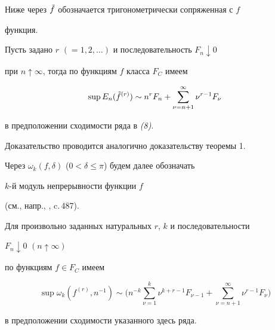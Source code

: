 Ниже через $\Tilde f$ обозначается тригонометрически сопряженная с $f$


функция.





\begin{thm}


Пусть задано $r$ $(=1,2,\dotsc)$ и последовательность $F_n\downarrow 0$


при $n\uparrow\infty$, тогда по функциям $f$ класса $F_C$ имеем


\begin{equation}


\sup E_n(\Tilde f^{(r)})\sim n^rF_n+\sum^\infty_{\nu=n+1}


\nu^{r-1}F_\nu


\end{equation}


в предположении сходимости ряда в {\em (8)}.


\end{thm}





Доказательство проводится аналогично доказательству теоремы 1.





Через $\omega_k(f,\delta)$ ($0<\delta\le\pi$) будем далее обозначать


$k$-й модуль непрерывности функции $f$


(см., напр., \cite{Bar}, c.\,487).





\begin{thm}


Для произвольно заданных натуральных $r$, $k$ и последовательности


$F_n\downarrow 0$ $(n\uparrow\infty)$


по функциям $f\in F_C$ имеем


$$


\sup\omega_k(f^{(r)},n^{-1})\sim\biggl(n^{-k}


\sum^k_{\nu=1}\nu^{k+r-1}F_{\nu-1}+\sum^\infty_{\nu=n+1}


\nu^{r-1}F_\nu\biggr)


$$


в предположении сходимости указанного здесь ряда.


\end{thm}





